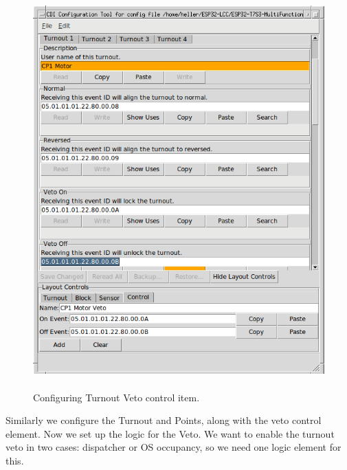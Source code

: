 \documentclass[12pt,twoside]{article}
\begin{document}
\begin{figure}[hbpt]\begin{centering}%
\includegraphics[height=6in]{ExampleSidingCP1-ConfigTurnout-Veto1.png}
\caption{Configuring Turnout Veto control item.}
\label{fig:ExampleSidingCP1-ConfigTurnout-Veto1}
\end{centering}\end{figure}


Similarly we configure the Turnout and Points, along with the veto control
element. Now we set up the logic for the Veto.  We want to enable the turnout 
veto in two cases: dispatcher or OS occupancy, so we need one logic element 
for this.
\end{document}
